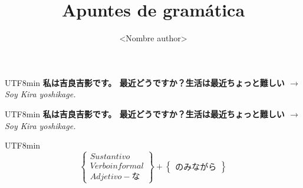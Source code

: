 \documentclass[a4paper, 11pt]{book}
\title{Apuntes de gramática}
\author{<Nombre author>}
\newcommand{\jpex}[2] {
	\vspace{1.0\baselineskip}
	\begin{CJK}{UTF8}{min}
		\noindent\textbf{\large{#1}}
		$\rightarrow$ \emph{#2}
	\end{CJK}
}
\newcommand{\grpre}[2]{
	\begin{CJK}{UTF8}{min}
	\[
		\left\{
			\begin{array}{l}
				#1
			\end{array}
		\right\}
		+
		\left\{
			\begin{array}{l}
				#2
			\end{array}
		\right\}
	\]
	\end{CJK}
}
\begin{document}
	\maketitle

	\jpex{
		私は吉良吉影です。 最近どうですか？生活は最近ちょっと難しい
	}{
		Soy Kira yoshikage.
	}
	
	\jpex{
		私は吉良吉影です。 最近どうですか？生活は最近ちょっと難しい
	}{
		Soy Kira yoshikage.
	}
	
	\grpre{
		Sustantivo \\ Verbo informal \\ Adjetivo-な
	}{
		のみながら
	}
\end{document}
